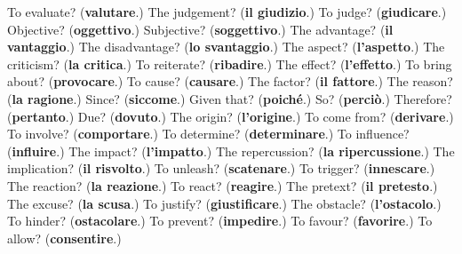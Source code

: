 \begin{tcolorbox}[breakable,colback=teal!4,colframe=teal!35!black,title={Before you move on}]
To evaluate? (\textbf{valutare}.) The judgement? (\textbf{il giudizio}.) To judge? (\textbf{giudicare}.) Objective? (\textbf{oggettivo}.) Subjective? (\textbf{soggettivo}.) The advantage? (\textbf{il vantaggio}.) The disadvantage? (\textbf{lo svantaggio}.) The aspect? (\textbf{l'aspetto}.) The criticism? (\textbf{la critica}.) To reiterate? (\textbf{ribadire}.) The effect? (\textbf{l'effetto}.) To bring about? (\textbf{provocare}.) To cause? (\textbf{causare}.) The factor? (\textbf{il fattore}.) The reason? (\textbf{la ragione}.) Since? (\textbf{siccome}.) Given that? (\textbf{poiché}.) So? (\textbf{perciò}.) Therefore? (\textbf{pertanto}.) Due? (\textbf{dovuto}.) The origin? (\textbf{l'origine}.) To come from? (\textbf{derivare}.) To involve? (\textbf{comportare}.) To determine? (\textbf{determinare}.) To influence? (\textbf{influire}.) The impact? (\textbf{l'impatto}.) The repercussion? (\textbf{la ripercussione}.) The implication? (\textbf{il risvolto}.) To unleash? (\textbf{scatenare}.) To trigger? (\textbf{innescare}.) The reaction? (\textbf{la reazione}.) To react? (\textbf{reagire}.) The pretext? (\textbf{il pretesto}.) The excuse? (\textbf{la scusa}.) To justify? (\textbf{giustificare}.) The obstacle? (\textbf{l'ostacolo}.) To hinder? (\textbf{ostacolare}.) To prevent? (\textbf{impedire}.) To favour? (\textbf{favorire}.) To allow? (\textbf{consentire}.)
\end{tcolorbox}

